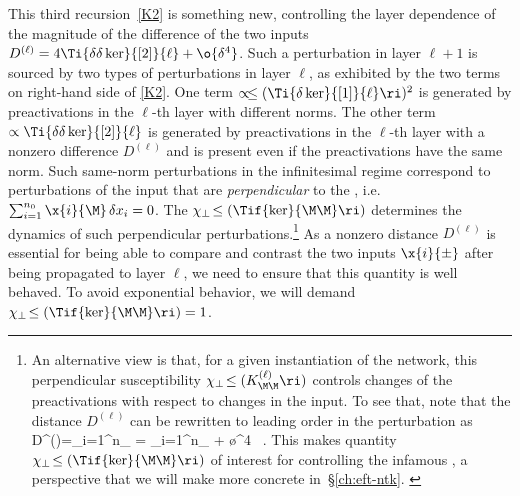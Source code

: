 This third recursion~\eqref{K2} is something new, controlling the layer dependence of 
the magnitude of the difference of the two inputs
$D^{(\ell)}=4\Ti{\delta\delta \ker}{[2]}{\ell}+\o{\delta^4}$.
Such a perturbation in layer $\ell+1$ is sourced by two types of perturbations in layer $\ell$, as exhibited by the two terms on right-hand side of \eqref{K2}. One term $\propto\!\le(\Ti{\delta \ker}{[1]}{\ell}\ri)^2$ is generated by preactivations in the $\ell$-th layer with different norms. The other term $\propto\Ti{\delta\delta \ker}{[2]}{\ell}$ is generated by preactivations in the $\ell$-th layer with a nonzero difference $D^{(\ell)}$ and is present even if the preactivations have the same norm.
Such same-norm perturbations in the infinitesimal regime correspond to perturbations of the input that are \emph{perpendicular} to the , i.e.~$\sum_{i=1}^{n_0} \x{i}{\M} \, \delta x_i  = 0$. 
The  $\chi_{\perp}\!\le(\Tif{\ker}{\M\M}\ri)$ determines the dynamics of such perpendicular perturbations.\footnote{An alternative view is that, for a given instantiation of the network, this perpendicular susceptibility $\chi_\perp\!\le(K^{(\ell)}_{\M\M}\ri)$ controls changes of the preactivations with respect to changes in the input. To see that, note that the distance $D^{(\ell)}$ can be rewritten to leading order in the perturbation as
\be
D^{(\ell)}=\sum_{i=1}^{n_{\ell}} = \sum_{i=1}^{n_{\ell}} + \o{\delta^4} \, .
\ee 
This makes quantity $\chi_{\perp}\!\le(\Tif{\ker}{\M\M}\ri)$  of interest for controlling the infamous ,
a perspective that we will make more concrete in~\S\ref{ch:eft-ntk}. \label{footnote:Jacobian}
}
As a nonzero distance $D^{(\ell)}$ is essential for being able to compare and contrast the two inputs $\x{i}{\pm}$ after being propagated to layer $\ell$, we need to ensure that this quantity is well behaved. To avoid exponential behavior, we will demand $\chi_{\perp}\!\le(\Tif{\ker}{\M\M}\ri) = 1$. 





